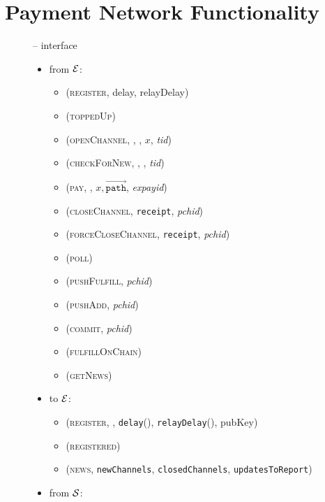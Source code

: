 \section{Payment Network Functionality}
  \label{appendix:payfunc}
  \begin{figure}[H]
    \begin{systembox}{\fpaynet{} -- interface}
      \begin{itemize}
        \item from $\mathcal{E}$:
        \begin{itemize}
          \item (\textsc{register}, delay, relayDelay)
          \item (\textsc{toppedUp})
          \item (\textsc{openChannel}, \alice, \bob, $x$, \textit{tid})
          \item (\textsc{checkForNew}, \alice, \bob, \textit{tid})
          \item (\textsc{pay}, \bob, $x, \overrightarrow{\mathtt{path}}$,
          \textit{expayid})
          \item (\textsc{closeChannel}, \texttt{receipt}, \textit{pchid})
          \item (\textsc{forceCloseChannel}, \texttt{receipt}, \textit{pchid})
          \item (\textsc{poll})
          \item (\textsc{pushFulfill}, \textit{pchid})
          \item (\textsc{pushAdd}, \textit{pchid})
          \item (\textsc{commit}, \textit{pchid})
          \item (\textsc{fulfillOnChain})
          \item (\textsc{getNews})
        \end{itemize}
        \item to $\mathcal{E}$:
        \begin{itemize}
          \item (\textsc{register}, \alice, \texttt{delay}(\alice),
          \texttt{relayDelay}(\alice), pubKey)
          \item (\textsc{registered})
          \item (\textsc{news}, \texttt{newChannels}, \texttt{closedChannels},
          \texttt{updatesToReport})
        \end{itemize}
        \item from $\mathcal{S}$:
        \begin{itemize}

\end{itemize}
\end{itemize}
\end{systembox}
\end{figure}
